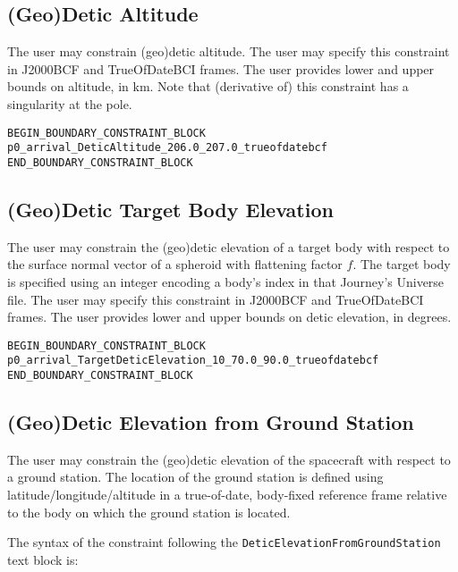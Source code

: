 \documentclass[11pt]{article}
\begin{document}
\subsection{(Geo)Detic Altitude}
\label{subsec:detic_altitude}

The user may constrain (geo)detic altitude. The user may specify this constraint in J2000BCF and TrueOfDateBCI frames. The user provides lower and upper bounds on altitude, in km.
Note that (derivative of) this constraint has a singularity at the pole.

\begin{verbatim}
BEGIN_BOUNDARY_CONSTRAINT_BLOCK
p0_arrival_DeticAltitude_206.0_207.0_trueofdatebcf
END_BOUNDARY_CONSTRAINT_BLOCK
\end{verbatim}

\subsection{(Geo)Detic Target Body Elevation}
\label{subsec:target_detic_elevation}

The user may constrain the (geo)detic elevation of a target body with respect to the surface normal vector of a spheroid with flattening factor $f$. The target body is specified using an integer encoding a body's index in that Journey's Universe file. The user may specify this constraint in J2000BCF and TrueOfDateBCI frames. The user provides lower and upper bounds on detic elevation, in degrees.


\begin{verbatim}
BEGIN_BOUNDARY_CONSTRAINT_BLOCK
p0_arrival_TargetDeticElevation_10_70.0_90.0_trueofdatebcf
END_BOUNDARY_CONSTRAINT_BLOCK
\end{verbatim}

\subsection{(Geo)Detic Elevation from Ground Station}
\label{subsec:detic_elevation_from_groundstation}

The user may constrain the (geo)detic elevation of the spacecraft with respect to a ground station. The location of the ground station is defined using latitude/longitude/altitude in a true-of-date, body-fixed reference frame relative to the body on which the ground station is located.

The syntax of the constraint following the \texttt{DeticElevationFromGroundStation} text block is:
\end{document}
